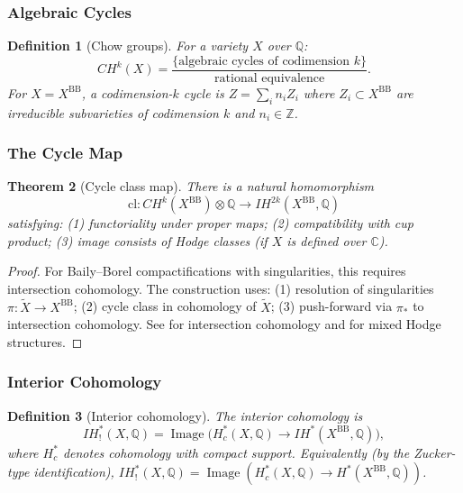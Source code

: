 \documentclass[12pt]{amsart}
\newtheorem{theorem}{Theorem}[section]
\newtheorem{definition}[theorem]{Definition}
\theoremstyle{definition}
\DeclareMathOperator\Image{Image}
\newcommand{\Q}{\mathbb{Q}}
\newcommand{\C}{\mathbb{C}}
\newcommand{\Z}{\mathbb{Z}}
\newcommand{\tensor}{\otimes}
\newcommand{\IH}{\mathit{IH}}
\newcommand{\CH}{\mathit{CH}}
\newcommand{\cl}{\mathrm{cl}}
\begin{document}
\subsubsection{Algebraic Cycles}

\begin{definition}[Chow groups]
For a variety $X$ over $\Q$:
\[
\CH^k(X) = \frac{\{ \text{algebraic cycles of codimension } k \}}{\text{rational equivalence}}.
\]
For $X = X^{\mathrm{BB}}$, a codimension-$k$ cycle is $Z = \sum_i n_i Z_i$ where $Z_i \subset X^{\mathrm{BB}}$ are irreducible subvarieties of codimension $k$ and $n_i \in \Z$.
\end{definition}

\subsubsection{The Cycle Map}

\begin{theorem}[Cycle class map]
There is a natural homomorphism
\[
\cl \colon \CH^k(X^{\mathrm{BB}}) \tensor \Q \to \IH^{2k}(X^{\mathrm{BB}}, \Q)
\]
satisfying: (1) functoriality under proper maps; (2) compatibility with cup product; (3) image consists of Hodge classes (if $X$ is defined over $\C$).
\end{theorem}
\begin{proof}
For Baily--Borel compactifications with singularities, this requires intersection cohomology. The construction uses: (1) resolution of singularities $\pi \colon \widetilde{X} \to X^{\mathrm{BB}}$; (2) cycle class in cohomology of $\widetilde{X}$; (3) push-forward via $\pi_*$ to intersection cohomology. See \cite{Goresky-MacPherson} for intersection cohomology and \cite{Saito-MHM} for mixed Hodge structures.
\end{proof}

\subsubsection{Interior Cohomology}

\begin{definition}[Interior cohomology]
The interior cohomology is
\[
\IH^*_!(X, \Q) = \Image\bigl( H^*_c(X, \Q) \to \IH^*(X^{\mathrm{BB}}, \Q) \bigr),
\]
where $H^*_c$ denotes cohomology with compact support. Equivalently (by the Zucker-type identification), $\IH^*_!(X, \Q) = \Image( H^*_c(X, \Q) \to H^*(X^{\mathrm{BB}}, \Q) )$.
\end{definition}
\end{document}

